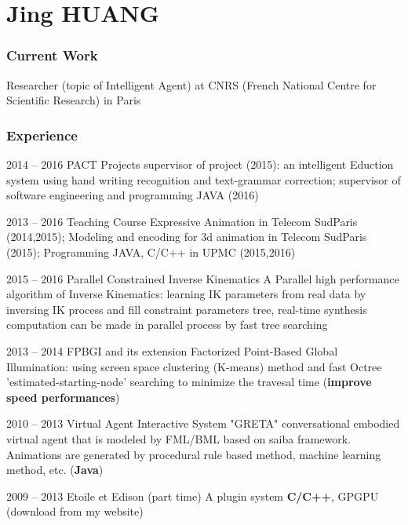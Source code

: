 \documentclass{tccv}
\begin{document}
\part{Jing HUANG}
\section{Current Work}
Researcher (topic of Intelligent Agent) at CNRS (French National Centre for Scientific Research) in Paris

\section{Experience}
\begin{eventlist}
\item{2014 -- 2016}
     {PACT Projects}
     {supervisor of project (2015): an intelligent Eduction system using hand writing recognition and text-grammar correction; supervisor of software engineering and programming JAVA (2016)}
		
\item{2013 -- 2016}
     {Teaching Course}
     {Expressive Animation in Telecom SudParis (2014,2015); Modeling and encoding for 3d animation in Telecom SudParis (2015);
			Programming JAVA, C/C++ in UPMC (2015,2016)}
			
\item{2015 -- 2016}
     {Parallel Constrained Inverse Kinematics}
     {A Parallel high performance algorithm of Inverse Kinematics: learning IK parameters from real data by inversing IK process and fill constraint parameters tree, real-time synthesis computation can be made in parallel process by fast tree searching}
		
\item{2013 -- 2014}
     {FPBGI and its extension}
     {Factorized Point-Based Global Illumination: using screen space clustering (K-means) method and fast Octree 'estimated-starting-node' searching to minimize the travesal time (\textbf{improve speed performances})}

\item{2010 -- 2013}
     {Virtual Agent Interactive System "GRETA"}
		 {conversational embodied virtual agent that is modeled by FML/BML based on saiba framework. Animations are generated by procedural rule based method, machine learning method, etc. 
		(\textbf{Java})
		}
		
\item{2009 -- 2013}
     {Etoile et Edison (part time)}
     {A plugin system \textbf{C/C++}, GPGPU (download from my website)}
		

\end{eventlist}
\end{document}
